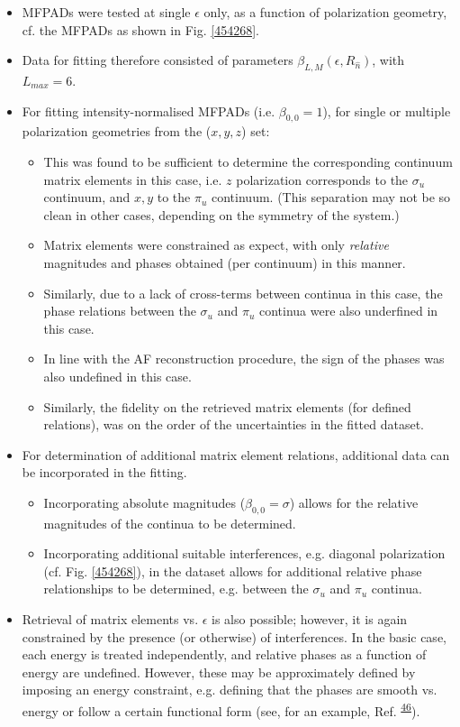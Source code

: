 \documentclass[10pt]{article}
\begin{document}
\begin{itemize}
\item MFPADs were tested at single $\epsilon$ only, as a function of polarization geometry, cf. the MFPADs as shown in Fig. \ref{454268}.
\item Data for fitting therefore consisted of parameters $\beta_{L,M}(\epsilon,R_{\hat{n}})$, with $L_{max}=6$.
\item For fitting intensity-normalised MFPADs (i.e. $\beta_{0,0}=1$), for single or multiple polarization geometries from the ($x,y,z$) set:
\begin{itemize}
\item This was found to be sufficient to determine the corresponding continuum matrix elements in this case, i.e. $z$ polarization corresponds to the $\sigma_u$ continuum, and $x,y$ to the $\pi_u$ continuum. (This separation may not be so clean in other cases, depending on the symmetry of the system.)
\item Matrix elements were constrained as expect, with only \textit{relative} magnitudes and phases obtained (per continuum) in this manner.
\item Similarly, due to a lack of cross-terms between continua in this case, the phase relations between the $\sigma_u$ and $\pi_u$ continua were also underfined in this case.
\item In line with the AF reconstruction procedure, the sign of the phases was also undefined in this case.
\item Similarly, the fidelity on the retrieved matrix elements (for defined relations), was on the order of the uncertainties in the fitted dataset.
\end{itemize}
\item For determination of additional matrix element relations, additional data can be incorporated in the fitting.
\begin{itemize}
\item Incorporating absolute magnitudes ($\beta_{0,0}=\sigma$) allows for the relative magnitudes of the continua to be determined.
\item Incorporating additional suitable interferences, e.g. diagonal polarization (cf. Fig. \ref{454268}), in the dataset allows for additional relative phase relationships to be determined, e.g. between the $\sigma_u$ and $\pi_u$ continua.
\end{itemize}
\item Retrieval of matrix elements vs. $\epsilon$ is also possible; however, it is again constrained by the presence (or otherwise) of interferences. In the basic case, each energy is treated independently, and relative phases as a function of energy are undefined. However, these may be approximately defined by imposing an energy constraint, e.g. defining that the phases are smooth vs. energy or follow a certain functional form (see, for an example, Ref. \textsuperscript{\hyperref[csl:46]{46}}). %
\end{itemize}
\end{document}
